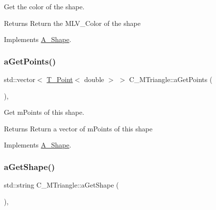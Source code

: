 Get the color of the shape. 

\begin{DoxyReturn}{Returns}
Return the M\+L\+V\+\_\+\+Color of the shape 
\end{DoxyReturn}


Implements \hyperlink{classA__Shape_a1e90c8132d33e4ac84d42f72606193b2}{A\+\_\+\+Shape}.

\mbox{\label{classC__MTriangle_ada409f8f1015cf7bf9f9ab8fb11da94b}} 
\subsubsection{\texorpdfstring{a\+Get\+Points()}{aGetPoints()}}
{\footnotesize\ttfamily std\+::vector$<$ \hyperlink{classT__Point}{T\+\_\+\+Point}$<$ double $>$ $>$ C\+\_\+\+M\+Triangle\+::a\+Get\+Points (\begin{DoxyParamCaption}{ }\end{DoxyParamCaption})\hspace{0.3cm}{\ttfamily [override]}, {\ttfamily [virtual]}}



Get m\+Points of this shape. 

\begin{DoxyReturn}{Returns}
Return a vector of m\+Points of this shape 
\end{DoxyReturn}


Implements \hyperlink{classA__Shape_a9fd1285bd63b1fc88943c9969bf01a5c}{A\+\_\+\+Shape}.

\mbox{\label{classC__MTriangle_aca7e38c6bf9695aacf54aa03ecfba978}} 
\subsubsection{\texorpdfstring{a\+Get\+Shape()}{aGetShape()}}
{\footnotesize\ttfamily std\+::string C\+\_\+\+M\+Triangle\+::a\+Get\+Shape (\begin{DoxyParamCaption}{ }\end{DoxyParamCaption})\hspace{0.3cm}{\ttfamily [override]}, {\ttfamily [virtual]}}



